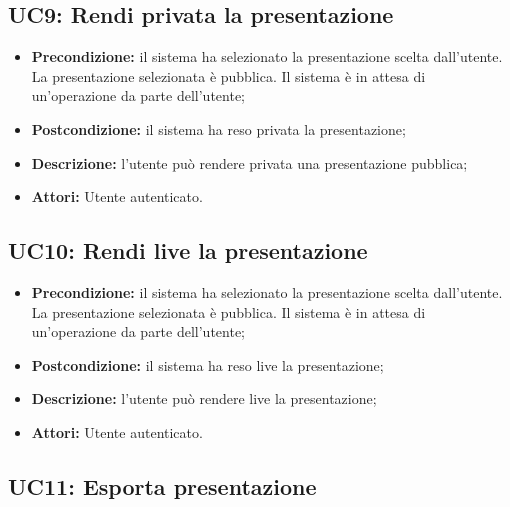 \subsection{ UC9: Rendi privata la presentazione}

\begin{itemize}
	\item \textbf{Precondizione:} il sistema ha selezionato la presentazione scelta dall'utente. La presentazione selezionata è pubblica. Il sistema è in attesa di un'operazione da parte dell'utente;
	\item \textbf{Postcondizione:} il sistema ha reso privata la presentazione;
	\item \textbf{Descrizione:} l'utente può rendere privata una presentazione pubblica;
	\item \textbf{Attori:} Utente autenticato.
\end{itemize}
\subsection{ UC10: Rendi live la presentazione}

\begin{itemize}
	\item \textbf{Precondizione:} il sistema ha selezionato la presentazione scelta dall'utente. La presentazione selezionata è pubblica. Il sistema è in attesa di un'operazione da parte dell'utente;
	\item \textbf{Postcondizione:} il sistema ha reso live la presentazione;
	\item \textbf{Descrizione:} l'utente può rendere live la presentazione;
	\item \textbf{Attori:} Utente autenticato.
\end{itemize}
\subsection{ UC11: Esporta presentazione}

